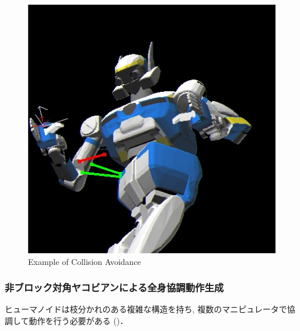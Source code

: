 \begin{figure}[htb]
  \begin{center}
    \includegraphics[width=0.50\columnwidth]{fig/collision-avoidance-example.jpg}
    \caption{Example of Collision Avoidance}
  \end{center}
\end{figure}


\subsubsection{非ブロック対角ヤコビアンによる全身協調動作生成}
ヒューマノイドは枝分かれのある複雑な構造を持ち,
複数のマニピュレータで協調して動作を行う必要がある
()．

